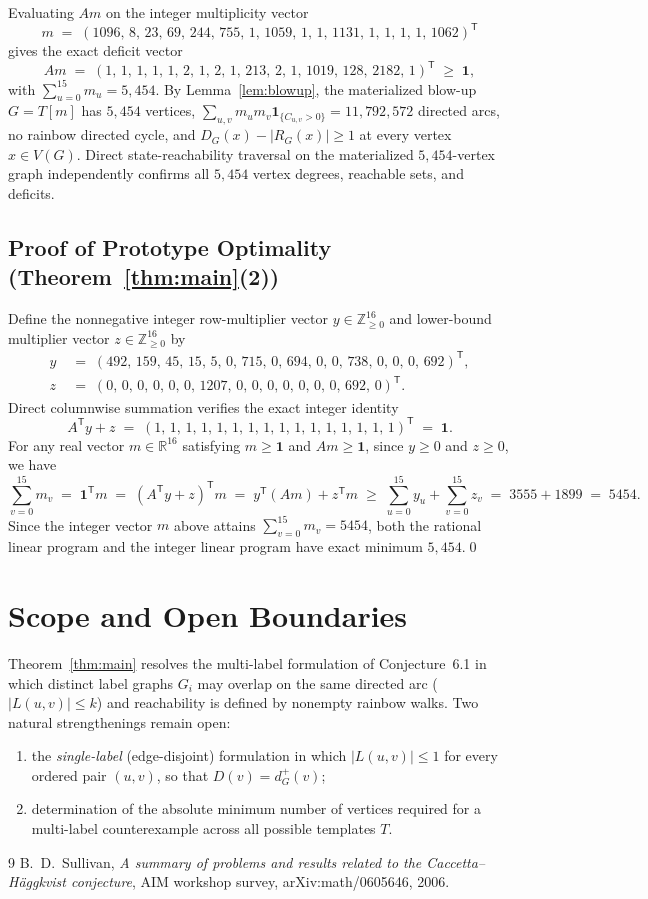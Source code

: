\documentclass[10pt,reqno]{amsart}
\theoremstyle{definition}
\begin{document}
Evaluating $A m$ on the integer multiplicity vector
\[
  m \;=\; (1096,\,8,\,23,\,69,\,244,\,755,\,1,\,1059,\,1,\,1,\,1131,\,1,\,1,\,1,\,1,\,1062)^{\mathsf T}
\]
gives the exact deficit vector
\[
  A m \;=\; (1,\,1,\,1,\,1,\,1,\,2,\,1,\,2,\,1,\,213,\,2,\,1,\,1019,\,128,\,2182,\,1)^{\mathsf T} \;\ge\; \mathbf{1},
\]
with $\sum_{u=0}^{15} m_u = 5{,}454$. By Lemma~\ref{lem:blowup}, the materialized blow-up $G=T[m]$ has $5{,}454$ vertices, $\sum_{u,v} m_u m_v \mathbf{1}_{\{C_{u,v}>0\}} = 11{,}792{,}572$ directed arcs, no rainbow directed cycle, and $D_G(x)-|R_G(x)|\ge 1$ at every vertex $x\in V(G)$. Direct state-reachability traversal on the materialized $5{,}454$-vertex graph independently confirms all $5{,}454$ vertex degrees, reachable sets, and deficits.

\subsection*{Proof of Prototype Optimality (Theorem~\ref{thm:main}(2))}

Define the nonnegative integer row-multiplier vector $y\in\mathbb{Z}_{\ge 0}^{16}$ and lower-bound multiplier vector $z\in\mathbb{Z}_{\ge 0}^{16}$ by
\begin{align*}
  y &\;=\; (492,\,159,\,45,\,15,\,5,\,0,\,715,\,0,\,694,\,0,\,0,\,738,\,0,\,0,\,0,\,692)^{\mathsf T}, \\
  z &\;=\; (0,\,0,\,0,\,0,\,0,\,0,\,1207,\,0,\,0,\,0,\,0,\,0,\,0,\,0,\,692,\,0)^{\mathsf T}.
\end{align*}
Direct columnwise summation verifies the exact integer identity
\[
  A^{\mathsf T} y + z \;=\; (1,\,1,\,1,\,1,\,1,\,1,\,1,\,1,\,1,\,1,\,1,\,1,\,1,\,1,\,1,\,1)^{\mathsf T} \;=\; \mathbf{1}.
\]
For any real vector $m\in\mathbb{R}^{16}$ satisfying $m\ge\mathbf{1}$ and $A m\ge\mathbf{1}$, since $y\ge 0$ and $z\ge 0$, we have
\[
  \sum_{v=0}^{15} m_v \;=\; \mathbf{1}^{\mathsf T} m \;=\; (A^{\mathsf T}y + z)^{\mathsf T} m
  \;=\; y^{\mathsf T}(A m) + z^{\mathsf T} m
  \;\ge\; \sum_{u=0}^{15} y_u + \sum_{v=0}^{15} z_v \;=\; 3555 + 1899 \;=\; 5454.
\]
Since the integer vector $m$ above attains $\sum_{v=0}^{15} m_v = 5454$, both the rational linear program and the integer linear program have exact minimum $5{,}454$.\qed

\section{Scope and Open Boundaries}

Theorem~\ref{thm:main} resolves the multi-label formulation of Conjecture~6.1 in which distinct label graphs $G_i$ may overlap on the same directed arc ($|L(u,v)|\le k$) and reachability is defined by nonempty rainbow walks. Two natural strengthenings remain open:
\begin{enumerate}[label=\textup{(\roman*)}]
  \item the \emph{single-label} (edge-disjoint) formulation in which $|L(u,v)|\le 1$ for every ordered pair $(u,v)$, so that $D(v)=d^+_G(v)$;
  \item determination of the absolute minimum number of vertices required for a multi-label counterexample across all possible templates $T$.
\end{enumerate}

\begin{thebibliography}{9}
B.~D.~Sullivan, \emph{A summary of problems and results related to the Caccetta--H\"aggkvist conjecture}, AIM workshop survey, arXiv:math/0605646, 2006.
\end{thebibliography}
\end{document}
